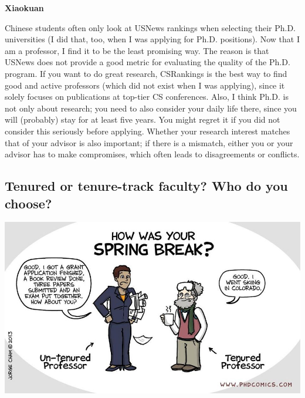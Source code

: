 \documentclass[11pt]{article}
\newenvironment{commentbox}[1][]{
\small
    \begin{cbox}
    \textbf{#1} 
 }{
   \end{cbox}
}
\begin{document}
\begin{commentbox}[Xiaokuan]
Chinese students often only look at USNews rankings when selecting their Ph.D. universities (I did that, too, when I was applying for Ph.D. positions).
Now that I am a professor, I find it to be the least promising way.
%
The reason is that USNews does not provide a good metric for evaluating the quality of the Ph.D. program.
%
If you want to do great research, CSRankings is the best way to find good and active professors (which did not exist when I was applying),
since it solely focuses on publications at top-tier CS conferences.
%
Also, 
I think Ph.D. is not only about research; 
you need to also consider your daily life there, since you will (probably) stay for at least five years.
%
You might regret it if you did not consider this seriously before applying.
%
Whether your research interest matches that of your advisor is also important;
if there is a mismatch,
either you or your advisor has to make compromises,
which often leads to disagreements or conflicts.  

\end{commentbox}


\subsection{Tenured or tenure-track faculty? Who do you choose?}

      \begin{center}
        \includegraphics[scale=0.4]{c8.png}
      \end{center}
\end{document}
